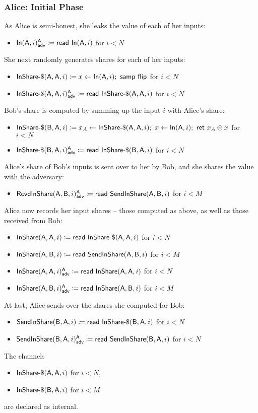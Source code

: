 \subsubsection{Alice: Initial Phase}
As Alice is semi-honest, she leaks the value of each of her inputs:
\begin{itemize}
\item {\color{blue} $\mathsf{In}(\mathsf{A},i)^{\mathsf{A}}_{\mathsf{adv}} \coloneqq \mathsf{read} \ \mathsf{In}(\mathsf{A},i)$ for $i < N$}
\end{itemize}
She next randomly generates shares for each of her inputs:
\begin{itemize}
\item $\mathsf{InShare}\textsf{-}\$(\mathsf{A},\mathsf{A},i) \coloneqq x \leftarrow \mathsf{In}(\mathsf{A},i); \ \mathsf{samp} \ \mathsf{flip}$ for $i < N$
\item {\color{blue} $\mathsf{InShare}\textsf{-}\$(\mathsf{A},\mathsf{A},i)^{\mathsf{A}}_{\mathsf{adv}} \coloneqq \mathsf{read} \ \mathsf{InShare}\textsf{-}\$(\mathsf{A},\mathsf{A},i)$ for $i < N$}
\end{itemize}
Bob's share is computed by summing up the input $i$ with Alice's share:
\begin{itemize}
\item $\mathsf{InShare}\textsf{-}\$(\mathsf{B},\mathsf{A},i) \coloneqq x_A \leftarrow \mathsf{InShare}\textsf{-}\$(\mathsf{A},\mathsf{A},i); \ x \leftarrow \mathsf{In}(\mathsf{A},i); \ \mathsf{ret} \ x_A \oplus x$ for $i < N$
\item {\color{blue} $\mathsf{InShare}\textsf{-}\$(\mathsf{B},\mathsf{A},i)^{\mathsf{A}}_{\mathsf{adv}} \coloneqq \mathsf{read} \ \mathsf{InShare}\textsf{-}\$(\mathsf{B},\mathsf{A},i)$ for $i < N$}
\end{itemize}
Alice's share of Bob's inputs is sent over to her by Bob, and she shares the value with the adversary:
\begin{itemize}
\item {\color{blue} $\mathsf{RcvdInShare}(\mathsf{A},\mathsf{B},i)^{\mathsf{A}}_{\mathsf{adv}} \coloneqq \mathsf{read} \ \mathsf{SendInShare}(\mathsf{A},\mathsf{B},i)$ for $i < M$}
\end{itemize}
Alice now records her input shares -- those computed as above, as well as those received from Bob:
\begin{itemize}
\item $\mathsf{InShare}(\mathsf{A},\mathsf{A},i) \coloneqq \mathsf{read} \ \mathsf{InShare}\textsf{-}\$(\mathsf{A},\mathsf{A},i)$ for $i < N$
\item $\mathsf{InShare}(\mathsf{A},\mathsf{B},i) \coloneqq \mathsf{read} \ \mathsf{SendInShare}(\mathsf{A},\mathsf{B},i)$ for $i < M$
\item {\color{blue} $\mathsf{InShare}(\mathsf{A},\mathsf{A},i)^{\mathsf{A}}_{\mathsf{adv}} \coloneqq \mathsf{read} \ \mathsf{InShare}(\mathsf{A},\mathsf{A},i)$ for $i < N$}
\item {\color{blue} $\mathsf{InShare}(\mathsf{A},\mathsf{B},i)^{\mathsf{A}}_{\mathsf{adv}} \coloneqq \mathsf{read} \ \mathsf{InShare}(\mathsf{A},\mathsf{B},i)$ for $i < M$}
\end{itemize}
At last, Alice sends over the shares she computed for Bob:
\begin{itemize}
\item $\mathsf{SendInShare}(\mathsf{B},\mathsf{A},i) \coloneqq \mathsf{read} \ \mathsf{InShare}\textsf{-}\$(\mathsf{B},\mathsf{A},i)$ for $i < N$
\item {\color{blue} $\mathsf{SendInShare}(\mathsf{B},\mathsf{A},i)^{\mathsf{A}}_{\mathsf{adv}} \coloneqq \mathsf{read} \ \mathsf{SendInShare}(\mathsf{B},\mathsf{A},i)$ for $i < N$}
\end{itemize}
The channels
\begin{itemize}
\item $\mathsf{InShare}\textsf{-}\$(\mathsf{A},\mathsf{A},i)$ for $i < N$,
\item $\mathsf{InShare}\textsf{-}\$(\mathsf{B},\mathsf{A},i)$ for $i < M$
\end{itemize}
are declared as internal.

